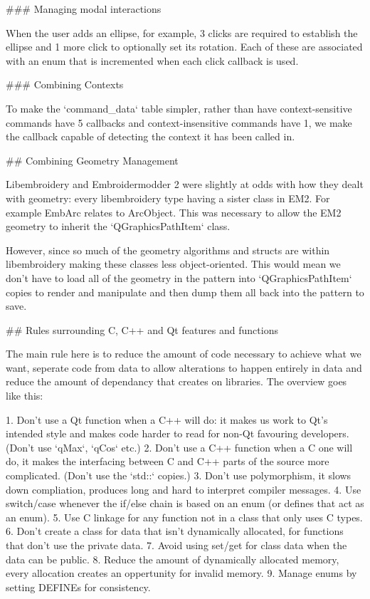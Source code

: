 ### Managing modal interactions

When the user adds an ellipse, for example, 3 clicks are required to establish the ellipse
and 1 more click to optionally set its rotation. Each of these are associated with an
enum that is incremented when each click callback is used.

### Combining Contexts

To make the `command_data` table simpler, rather than have context-sensitive commands
have 5 callbacks and context-insensitive commands have 1, we make the callback capable of
detecting the context it has been called in.

## Combining Geometry Management

Libembroidery and Embroidermodder 2 were slightly at odds with how they dealt with geometry:
every libembroidery type having a sister class in EM2. For example EmbArc relates to ArcObject.
This was necessary to allow the EM2 geometry to inherit the `QGraphicsPathItem`
class.

However, since so much of the geometry algorithms and structs are within
libembroidery making these classes less object-oriented. This would mean we don't have to
load all of the geometry in the pattern into `QGraphicsPathItem` copies to render and manipulate
and then dump them all back into the pattern to save.

## Rules surrounding C, C++ and Qt features and functions

The main rule here is to reduce the amount of code necessary to achieve what we want,
seperate code from data to allow alterations to happen entirely in data and reduce the amount of
dependancy that creates on libraries. The overview goes like this:

1. Don't use a Qt function when a C++ will do: it makes us work to Qt's intended style and makes code harder to read for non-Qt favouring developers. (Don't use `qMax`, `qCos` etc.)
2. Don't use a C++ function when a C one will do, it makes the interfacing between C and C++ parts of the source more complicated. (Don't use the `std::` copies.)
3. Don't use polymorphism, it slows down compliation, produces long and hard to interpret compiler messages.
4. Use switch/case whenever the if/else chain is based on an enum (or defines that act as an enum).
5. Use C linkage for any function not in a class that only uses C types.
6. Don't create a class for data that isn't dynamically allocated, for functions that don't use the private data.
7. Avoid using set/get for class data when the data can be public.
8. Reduce the amount of dynamically allocated memory, every allocation creates an oppertunity for invalid memory.
9. Manage enums by setting DEFINEs for consistency.

